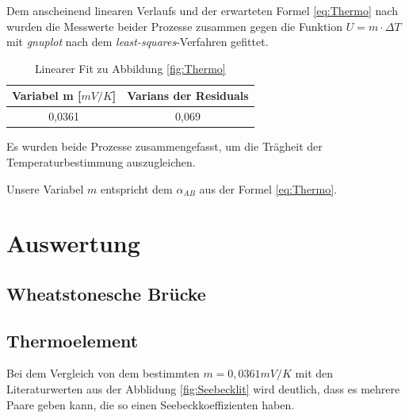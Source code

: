 Dem anscheinend linearen Verlaufs und der erwarteten Formel \ref{eq:Thermo} nach wurden die Messwerte beider Prozesse zusammen gegen die Funktion $U=m\cdot\Delta T$ mit \emph{gnuplot} nach dem \emph{least-squares}-Verfahren gefittet.
\begin{table}[H]
  \centering
  \begin{tabular}{c | c}
    Variabel m [$mV/K$] & Varians der Residuals\\ \hline
    0,0361  & 0,069
  \end{tabular}
  \caption{Linearer Fit zu Abbildung \ref{fig:Thermo}}
  \label{tab:fitThermo}
\end{table}
Es wurden beide Prozesse zusammengefasst, um die Trägheit der Temperaturbestimmung auszugleichen.

Unsere Variabel $m$ entspricht dem $\alpha_{AB}$ aus der Formel \ref{eq:Thermo}. 
\section{Auswertung}
\subsection{Wheatstonesche Brücke}
\subsection{Thermoelement}
Bei dem Vergleich von dem bestimmten $m=0,0361 mV/K$ mit den Literaturwerten aus der Abblidung \ref{fig:Seebecklit} wird deutlich, dass es mehrere Paare geben kann, die so einen Seebeckkoeffizienten haben.

